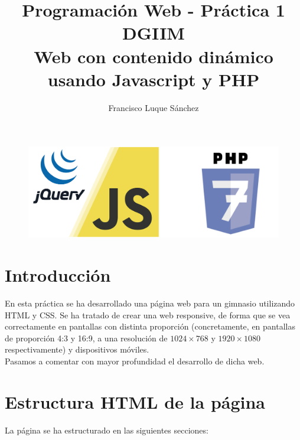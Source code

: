\documentclass[11pt]{article}
\theoremstyle{plain}
\theoremstyle{definition}
\begin{document}
\title{Programación Web - Práctica 1\\
  DGIIM \\
  \large Web con contenido dinámico usando Javascript y PHP}
\author{Francisco Luque Sánchez}
\maketitle

\begin{figure}[H]
  \centering
  \includegraphics[width=.5\textwidth]{js_php.png}
\end{figure}


\section{Introducción}

En esta práctica se ha desarrollado una página web para un gimnasio
utilizando HTML y CSS. Se ha tratado de crear una web responsive, de
forma que se vea correctamente en pantallas con distinta proporción
(concretamente, en pantallas de proporción 4:3 y 16:9, a una
resolución de $1024 \times 768$ y $1920 \times 1080$ respectivamente)
y dispositivos móviles.\\

Pasamos a comentar con mayor profundidad el desarrollo de dicha web.

\section{Estructura HTML de la página}

La página se ha estructurado en las siguientes secciones:
\end{document}
